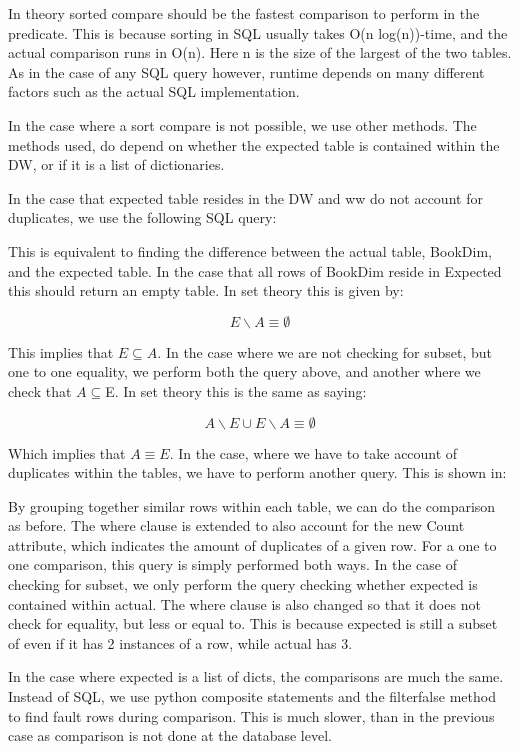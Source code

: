 In theory sorted compare should be the fastest comparison to perform in the predicate. This is because sorting in SQL usually takes O(n log(n))-time, and the actual comparison runs in O(n). Here n is the size of the largest of the two tables. As in the case of any SQL query however, runtime depends on many different factors such as the actual SQL implementation.

In the case where a sort compare is not possible, we use other methods. The methods used, do depend on whether the expected table is contained within the DW, or if it is a list of dictionaries. 

In the case that expected table resides in the DW and ww do not account for duplicates, we use the following SQL query:


This is equivalent to finding the difference between the actual table, BookDim, and the expected table. In the case that all rows of BookDim reside in Expected this should return an empty table. In set theory this is given by:

\[ E \backslash A \equiv \emptyset \]

This implies that $E \subseteq A$. In the case where we are not checking for subset, but one to one equality, we perform both the query above, and another where we check that  $A \subseteq $E. In set theory this is the same as saying:

\[ A \backslash E \cup E \backslash A \equiv \emptyset \]

Which implies that $A \equiv E$. In the case, where we have to take account of duplicates within the tables, we have to perform another query. This is shown in:


By grouping together similar rows within each table, we can do the comparison as before. The where clause is extended to also account for the new Count attribute, which indicates the amount of duplicates of a given row. For a one to one comparison, this query is simply performed both ways. In the case of checking for subset, we only perform the query checking whether expected is contained within actual. The where clause is also changed so that it does not check for equality, but less or equal to. This is because expected is still a subset of even if it has 2 instances of a row, while actual has 3. 

In the case where expected is a list of dicts,  the comparisons are much the same. Instead of SQL, we use python composite statements and the filterfalse method to find fault rows during comparison. This is much slower, than in the previous case as comparison is not done at the database level.